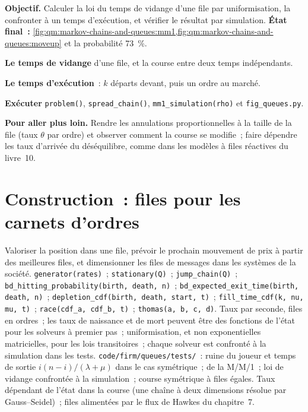\begin{tutorial}
\textbf{Objectif.} Calculer la loi du temps de vidange d'une file par uniformisation, la confronter à un temps d'exécution, et
vérifier le résultat par simulation. \textbf{État final~:}
\cref{fig:qm:markov-chains-and-queues:mm1,fig:qm:markov-chains-and-queues:moveup} et la probabilité 73~\%.
\begin{tutsteps}
\item \textbf{Le temps de vidange} d'une file, et la course entre deux temps indépendants.
\label{lst:qm:markov-chains-and-queues:depletion}
\item \textbf{Le temps d'exécution}~: $k$ départs devant, puis un ordre au marché.
\label{lst:qm:markov-chains-and-queues:fill}
\item \textbf{Exécuter} \texttt{problem()}, \texttt{spread\_chain()}, \texttt{mm1\_simulation(rho)} et
\texttt{fig\_queues.py}.
\end{tutsteps}
\textbf{Pour aller plus loin.} Rendre les annulations proportionnelles à la taille de la file (taux $\theta$ par ordre) et observer
comment la course se modifie~; faire dépendre les taux d'arrivée du déséquilibre, comme dans les modèles à files réactives du
livre~10.
\end{tutorial}

\section{Construction~: files pour les carnets d'ordres}\label{bld:qm:markov-chains-and-queues:queues}

\begin{build}
 Valoriser la position dans une file, prévoir le prochain mouvement de prix à partir des meilleures files, et
dimensionner les files de messages dans les systèmes de la société.
 \texttt{generator(rates)}~; \texttt{stationary(Q)}~; \texttt{jump\_chain(Q)}~;
\texttt{bd\_hitting\_probability(birth, death, n)}~; \texttt{bd\_expected\_exit\_time(birth, death, n)}~;
\texttt{depletion\_cdf(birth, death, start, t)}~; \texttt{fill\_time\_cdf(k, nu, mu, t)}~; \texttt{race(cdf\_a,
cdf\_b, t)}~; \texttt{thomas(a, b, c, d)}.
 Taux par seconde, files en ordres~; les taux de naissance et de mort peuvent être des fonctions de l'état pour les
solveurs à premier pas~; uniformisation, et non exponentielles matricielles, pour les lois transitoires~; chaque solveur est confronté
à la simulation dans les tests.
 \texttt{code/firm/queues/tests/}~: ruine du joueur et temps de sortie $i(n - i)/(\lambda + \mu)$ dans le
cas symétrique~;  de la M/M/1~; loi de vidange confrontée à la simulation~; course symétrique à files égales.
 Taux dépendant de l'état dans la course (une chaîne à deux dimensions résolue par Gauss--Seidel)~; files alimentées
par le flux de Hawkes du chapitre~7.
\end{build}

